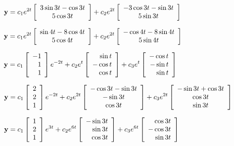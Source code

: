 \smallskip
{}
$\displaystyle{{\bf y}=c_{1}e^{2t}\left[\begin{array}{c}3\sin3t-\cos3t
\\5\cos3t\end{array}\right]+
c_{2}e^{2t}\left[\begin{array}{c}
-3\cos3t-\sin3t\\5\sin3t\end{array}\right]}$

\smallskip
{}
$\displaystyle{{\bf y}=c_{1}e^{2t}\left[\begin{array}{c}\sin4t-8\cos4t
\\5\cos4t\end{array}\right]+
c_{2}e^{2t}\left[\begin{array}{c}
-\cos4t-8\sin4t\\5\sin4t\end{array}\right]}$

\smallskip
{}
$\displaystyle{{\bf y}=c_{1}\left[\begin{array}{r}-1\\1\\1
\end{array}\right]e^{-2t}+c_{2}e^{t}\left[\begin{array}{r}\sin t\\-\cos
t\\\cos t\end{array}\right]+c_{3}e^{t}\left[\begin{array}{r}-\cos t
\\-\sin t\\\sin t
\end{array}\right]}$

\smallskip
{}
$\displaystyle{{\bf y}=c_{1}\left[\begin{array}{c}2\\2\\1
\end{array}\right]e^{-2t}+
c_{2}e^{2t}\left[\begin{array}{c}-\cos3t-\sin3t\\-\sin3t\\
\cos3t\end{array}\right]+c_{3}e^{2t}\left[\begin{array}{c}
-\sin3t+\cos3t\\\cos3t\\\sin3t\end{array}\right]}$

\smallskip
{}
$\displaystyle{{\bf y}=c_{1}\left[\begin{array}{r}1\\2\\1
\end{array}\right]e^{3t}+c_{2}e^{6t}\left[\begin{array}{r}-\sin3t
\\\sin3t\\\cos3t\end{array}\right]+
c_{3}e^{6t}\left[\begin{array}{r}\cos3t
\\-\cos3t\\\sin3t\end{array}\right]}$

